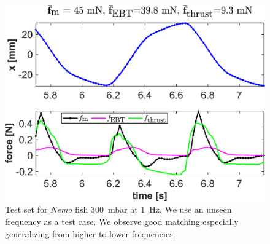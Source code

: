 \begin{figure}[h]
    \centering
    \includegraphics[width=0.8\columnwidth]{figures_appendix/error_analysis_300_mbar_1_Hz.pdf}
    \caption{Test set for \emph{Nemo} fish \SI{300}{mbar} at \SI{1}{Hz}. We use an unseen frequency as a test case. We observe good matching especially generalizing from higher to lower frequencies.}
    \label{fig:Nemo2}
\end{figure}
\fi